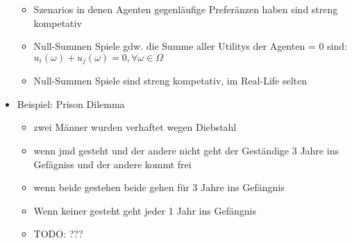 \documentclass{article} %
\begin{document}
\begin{itemize}
\begin{itemize}
			\item Szenarios in denen Agenten gegenläufige Preferänzen haben sind streng kompetativ
			\item Null-Summen Spiele gdw. die Summe aller Utilitys der Agenten = 0 sind: $u_i(\omega) + u_j(\omega) = 0, \forall \omega \in \Omega$
			\item Null-Summen Spiele sind streng kompetativ, im Real-Life selten
		\end{itemize}
		\item Beispiel: Prison Dilemma
		\begin{itemize}
			\item zwei Männer wurden verhaftet wegen Diebstahl
			\item wenn jmd gesteht und der andere nicht geht der Geständige 3 Jahre ins Gefägniss und der andere kommt frei
			\item wenn beide gestehen beide gehen für 3 Jahre ins Gefängnis
			\item Wenn keiner gesteht geht jeder 1 Jahr ins Gefängnis\\
			\item TODO: ???
		\end{itemize}
	\end{itemize}
\end{document}
